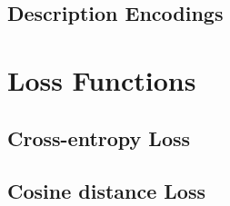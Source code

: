 \subsection{Description Encodings}
\label{subsec:description-encodings}

\section{Loss Functions}
\label{sec:losses}

\subsection{Cross-entropy Loss}
\label{subsec:cross-entropy-loss}

\subsection{Cosine distance Loss}
\label{subsec:cosine-distance-loss}
